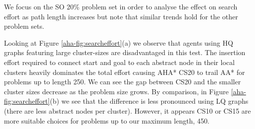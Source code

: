 We focus on the SO 20\% problem set in order to analyse the effect on search effort as path length increases but note that similar trends hold for the other problem sets.
\par \indent
Looking at Figure \ref{aha-fig:searcheffort}(a) we observe that agents using HQ graphs featuring large cluster-sizes are disadvantaged in this test. 
The insertion effort required to connect start and goal to each abstract node in their local clusters heavily dominates the total effort causing AHA* CS20 to trail AA* for problems up to length 250.
We can see the gap between CS20 and the smaller cluster sizes decrease as the problem size grows.
By comparison, in Figure \ref{aha-fig:searcheffort}(b) we see that the difference is less pronounced using LQ graphs (there are less abstract nodes per cluster). However, it appears CS10 or CS15 are more suitable choices for problems up to our maximum length, 450.
